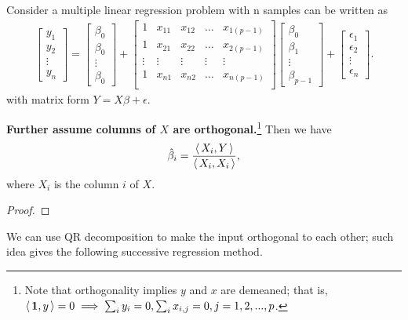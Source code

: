 \begin{refsection}
\begin{corollary}
Consider a multiple linear regression problem  with n samples can be written as
\begin{align*}
\begin{bmatrix}
y_1\\
y_2\\
\vdots\\
y_n
\end{bmatrix} = \begin{bmatrix}
\beta_0\\
\beta_0\\
\vdots\\
\beta_0
\end{bmatrix}+\begin{bmatrix}
1 & x_{11} & x_{12} & \dots & x_{1(p-1)}\\
1 & x_{21} & x_{22} & \dots & x_{2(p-1)}\\
\vdots & \vdots & \vdots & \vdots & \vdots \\
1 & x_{n1} & x_{n2} & \dots & x_{n(p-1)}\\
\end{bmatrix}
\begin{bmatrix}
\beta_0\\
\beta_1\\
\vdots\\
\beta_{p-1}
\end{bmatrix}
+ \begin{bmatrix}
\epsilon_1\\
\epsilon_2\\
\vdots\\
\epsilon_{n}
\end{bmatrix}.
\end{align*}
with matrix form
$Y = X\beta + \epsilon$.

\textbf{Further assume columns of $X$ are orthogonal.}\footnote{Note that orthogonality implies $y$ and $x$ are demeaned; that is, ${\left< \, \bm{1},y \, \right>} = 0\implies\sum_i y_i = 0, \sum_{i}x_{i,j} = 0, j=1,2,...,p$.} 
Then we have 
$$\hat{\beta}_i = \frac{ {\left< \, X_i,Y \, \right>}}{{\left< \, X_i,X_i \, \right>}},$$
where $X_i$ is the column $i$ of $X$.
\end{corollary}
\begin{proof}

\end{proof}	


\begin{remark}
We can use QR decomposition to make the input orthogonal to each other; such idea gives the following successive regression method.
\end{remark}




\end{refsection}
